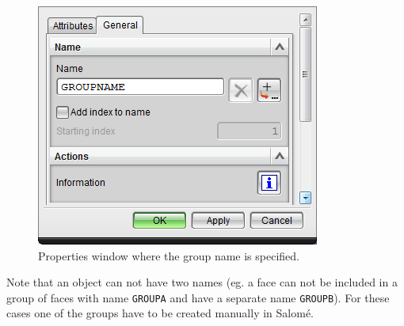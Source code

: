 \documentclass[10pt,a4paper,notitlepage]{scrartcl}
\begin{document}
\begin{figure}[H]
	\centering
	\includegraphics[scale=0.9]{properties}
	\caption{Properties window where the group name is specified.}
	\label{fig:properties}
\end{figure}

Note that an object can not have two names (eg. a face can not be included in a group of faces with name \texttt{GROUPA} and have a separate name \texttt{GROUPB}). For these cases one of the groups have to be created manually in Salomé.
\end{document}
